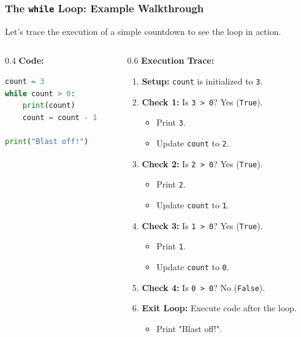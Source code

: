 \documentclass{beamer}
\begin{document}
\begin{frame}[fragile]
    \frametitle{The \texttt{while} Loop: Example Walkthrough}
    
    Let's trace the execution of a simple countdown to see the loop in action.
    
    \begin{columns}[T]
        \begin{column}{0.4\textwidth}
            \textbf{Code:}
            \begin{lstlisting}[language=Python]
count = 3
while count > 0:
    print(count)
    count = count - 1

print("Blast off!")
            \end{lstlisting}
        \end{column}
        \begin{column}{0.6\textwidth}
            \textbf{Execution Trace:}
            \begin{enumerate}
                \item \textbf{Setup:} \texttt{count} is initialized to \texttt{3}.
                \item \textbf{Check 1:} Is \texttt{3 > 0}? Yes (\texttt{True}).
                \begin{itemize}
                    \item Print \texttt{3}.
                    \item Update \texttt{count} to \texttt{2}.
                \end{itemize}
                \item \textbf{Check 2:} Is \texttt{2 > 0}? Yes (\texttt{True}).
                \begin{itemize}
                    \item Print \texttt{2}.
                    \item Update \texttt{count} to \texttt{1}.
                \end{itemize}
                \item \textbf{Check 3:} Is \texttt{1 > 0}? Yes (\texttt{True}).
                \begin{itemize}
                    \item Print \texttt{1}.
                    \item Update \texttt{count} to \texttt{0}.
                \end{itemize}
                \item \textbf{Check 4:} Is \texttt{0 > 0}? No (\texttt{False}).
                \item \textbf{Exit Loop:} Execute code after the loop.
                \begin{itemize}
                    \item Print "Blast off!".
                \end{itemize}
            \end{enumerate}
        \end{column}
    \end{columns}
    

\end{frame}
\end{document}
